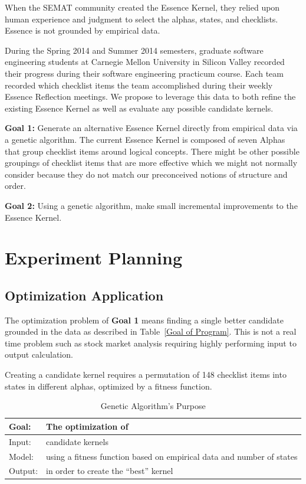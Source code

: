 \documentclass[conference]{IEEEtran}
\begin{document}
When the SEMAT community created the Essence Kernel, they relied upon human experience and judgment to select the alphas, states, and checklists. Essence is not grounded by empirical data. 

During the Spring 2014 and Summer 2014 semesters, graduate software engineering students at Carnegie Mellon University in Silicon Valley recorded their progress during their software engineering practicum course. Each team recorded which checklist items the team accomplished during their weekly Essence Reflection meetings. We propose to leverage this data to both refine the existing Essence Kernel as well as evaluate any possible candidate kernels. 

\textbf{Goal 1:} Generate an alternative Essence Kernel directly from empirical data via a genetic algorithm. The current Essence Kernel is composed of seven Alphas that group checklist items around logical concepts. There might be other possible groupings of checklist items that are more effective which we might not normally consider because they do not match our preconceived notions of structure and order.

\textbf{Goal 2:} Using a genetic algorithm, make small incremental improvements to the Essence Kernel.

\section{Experiment Planning}
\subsection{Optimization Application}
\label{Optimization Application}
The optimization problem of \textbf{Goal 1} means finding a single better candidate grounded in the data as described in Table~\ref{Goal of Program}. This is not a real time problem such as stock market analysis requiring highly performing input to output calculation.

Creating a candidate kernel requires a permutation of 148 checklist items into states in different alphas, optimized by a fitness function.

\begin{table}[h]
\caption{Genetic Algorithm's Purpose}
\label{Goal of Program}
\label{Goal}
\centering
\begin{tabular}{|p{0.80in}|p{2.30in}|}
\hline
{Goal:}  & {The optimization of} \\ \hline
{Input:} & {candidate kernels}  \\ \hline
{Model:} & {using a fitness function based on empirical data and number of states} \\ \hline
{Output:} & {in order to create the “best” kernel} \\ \hline
\end{tabular}
\end{table}
\end{document}
